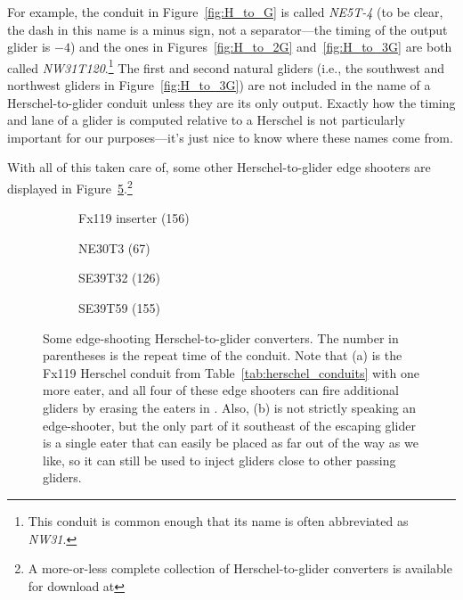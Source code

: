 For example, the conduit in Figure~\ref{fig:H_to_G} is called \emph{NE5T-4} (to be clear, the dash in this name is a minus sign, not a separator---the timing of the output glider is $-4$) and the ones in Figures~\ref{fig:H_to_2G} and~\ref{fig:H_to_3G} are both called \emph{NW31T120}.\footnote{This conduit is common enough that its name is often abbreviated as \emph{NW31}.} The first and second natural gliders (i.e., the southwest and northwest gliders in Figure~\ref{fig:H_to_3G}) are not included in the name of a Herschel-to-glider conduit unless they are its only output. Exactly how the timing and lane of a glider is computed relative to a Herschel is not particularly important for our purposes---it's just nice to know where these names come from.

With all of this taken care of, some other Herschel-to-glider edge shooters are displayed in Figure~\ref{fig:herschel_to_glider_edge}.\footnote{A more-or-less complete collection of Herschel-to-glider converters is available for download at }

\begin{figure}[!htb]
	\centering
	\begin{subfigure}{.205\textwidth}
		\centering
		\caption{Fx119 inserter (156)}
		\label{fig:herschel_to_glider_edge_3}
	\end{subfigure} \hfill %
	\begin{subfigure}{.245\textwidth}
		\centering\vspace*{0.9cm}
		\caption{NE30T3 (67)}
		\label{fig:herschel_to_glider_edge_4}
	\end{subfigure} \hfill %
	\begin{subfigure}{.245\textwidth}
		\centering\vspace*{1.2cm}
		\caption{SE39T32 (126)}
		\label{fig:herschel_to_glider_edge_1}
	\end{subfigure} \hfill %
	\begin{subfigure}{.235\textwidth}
		\centering
		\caption{SE39T59 (155)}
		\label{fig:herschel_to_glider_edge_2}
	\end{subfigure}
	\caption{Some edge-shooting Herschel-to-glider converters. The number in parentheses is the repeat time of the conduit. Note that (a) is the Fx119 Herschel conduit from Table~\ref{tab:herschel_conduits} with one more eater, and all four of these edge shooters can fire additional gliders by erasing the eaters in . Also, (b) is not strictly speaking an edge-shooter, but the only part of it southeast of the escaping glider is a single eater that can easily be placed as far out of the way as we like, so it can still be used to inject gliders close to other passing gliders.}\label{fig:herschel_to_glider_edge}
\end{figure}


